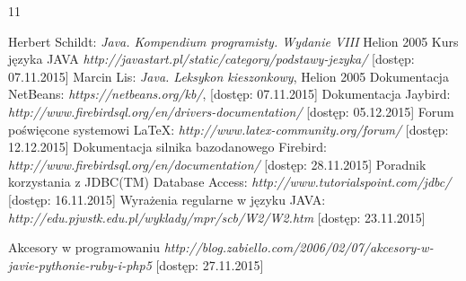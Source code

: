 

\raggedright

\setcounter{secnumdepth}{-1}
\begin {thebibliography}{11} 

 Herbert Schildt: \emph{Java. Kompendium programisty. Wydanie VIII}  Helion 2005
\vspace{1.21em}
 Kurs języka JAVA  \emph{http://javastart.pl/static/category/podstawy-jezyka/} [dostęp: 07.11.2015]
\vspace{1.21em}
 Marcin Lis: \emph{Java. Leksykon kieszonkowy}, Helion 2005
\vspace{1.21em}
 Dokumentacja NetBeans: \emph{https://netbeans.org/kb/}, [dostęp: 07.11.2015]
\vspace{1.21em}
 Dokumentacja Jaybird: \emph{http://www.firebirdsql.org/en/drivers-documentation/} [dostęp: 05.12.2015]
\vspace{1.21em}
 Forum poświęcone systemowi LaTeX: \emph{http://www.latex-community.org/forum/} [dostęp: 12.12.2015]
\vspace{1.21em}
 Dokumentacja silnika bazodanowego Firebird: \emph{http://www.firebirdsql.org/en/documentation/} [dostęp: 28.11.2015]
\vspace{1.21em}
 Poradnik korzystania z JDBC(TM) Database Access: \emph{http://www.tutorialspoint.com/jdbc/} [dostęp: 16.11.2015]
\vspace{1.21em}
 Wyrażenia regularne w języku JAVA: \emph{http://edu.pjwstk.edu.pl/wyklady/mpr/scb/W2/W2.htm} [dostęp: 23.11.2015]

\vspace{1.21em}
  Akcesory w programowaniu \emph{http://blog.zabiello.com/2006/02/07/akcesory-w-javie-pythonie-ruby-i-php5} [dostęp: 27.11.2015]

\end {thebibliography}



